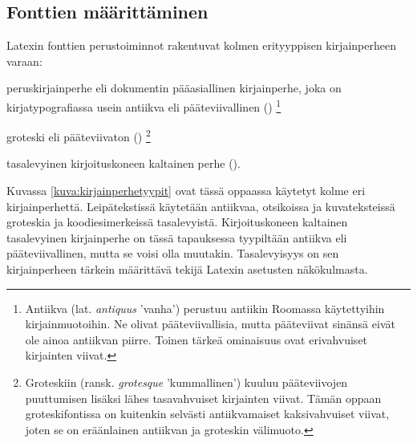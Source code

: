 \subsection{Fonttien määrittäminen}
\label{luku:fontin_valinta}

Latexin fonttien perustoiminnot rakentuvat kolmen erityyppisen
kirjainperheen varaan:

\begin{nluetelma}

\item peruskirjainperhe eli dokumentin pääasiallinen kirjainperhe, joka
  on kirjatypografiassa usein antiikva eli pääteviivallinen
  ()%
  \footnote{Antiikva (lat. \emph{antiquus} 'vanha') perustuu antiikin
    Roomassa käytettyihin kirjainmuotoihin. Ne olivat pääteviivallisia,
    mutta pääteviivat sinänsä eivät ole ainoa antiikvan piirre. Toinen
    tärkeä ominaisuus ovat erivahvuiset kirjainten viivat.}

\item groteski eli pääteviivaton ()%
  \footnote{Groteskiin (ransk. \emph{grotesque} 'kummallinen') kuuluu
    pääteviivojen puuttumisen lisäksi lähes tasavahvuiset kirjainten
    viivat. Tämän oppaan groteskifontissa on kuitenkin selvästi
    antiikvamaiset kaksivahvuiset viivat, joten se on eräänlainen
    antiikvan ja groteskin välimuoto.}

\item tasalevyinen kirjoituskoneen kaltainen perhe
  ().

\end{nluetelma}

Kuvassa \ref{kuva:kirjainperhetyypit} ovat tässä oppaassa käytetyt kolme
eri kirjainperhettä. Leipätekstissä käytetään antiikvaa, otsikoissa ja
kuvateksteissä groteskia ja koodiesimerkeissä tasalevyistä.
Kirjoituskoneen kaltainen tasalevyinen kirjainperhe on tässä tapauksessa
tyypiltään antiikva eli pääteviivallinen, mutta se voisi olla muutakin.
Tasalevyisyys on sen kirjainperheen tärkein määrittävä tekijä Latexin
asetusten näkökulmasta.



